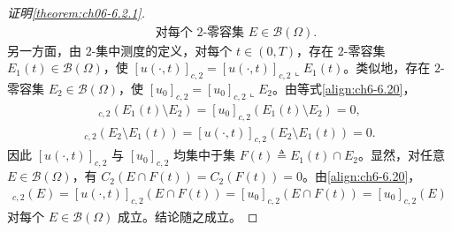\documentclass[../../main.tex]{subfiles}%
\begin{document}
\begin{proof}[证明\cref{theorem:ch06-6.2.1}]
\begin{align}
\quad\text{对每个 }2\text{-零容集 }E\in\mathscr{B}(\Omega). \label{align:ch6-6.20}
\end{align}
另一方面，由 $2$-集中测度的定义，对每个 $t\in(0,T)$，存在 $2$-零容集 $E_1(t)\in\mathscr{B}(\Omega)$，使 $[u(\cdot,t)]_{c,2}=[u(\cdot,t)]_{c,2}\llcorner E_1(t)$。类似地，存在 $2$-零容集 $E_2\in\mathscr{B}(\Omega)$，使 $[u_0]_{c,2}=[u_0]_{c,2}\llcorner E_2$。由等式\eqref{align:ch6-6.20}，
\begin{align*}
[u(\cdot,t)]_{c,2}(E_1(t)\setminus E_2)=[u_0]_{c,2}(E_1(t)\setminus E_2)=0,
\end{align*}
\begin{align*}
[u_0]_{c,2}(E_2\setminus E_1(t))=[u(\cdot,t)]_{c,2}(E_2\setminus E_1(t))=0.
\end{align*}
因此 $[u(\cdot,t)]_{c,2}$ 与 $[u_0]_{c,2}$ 均集中于集 $F(t)\triangleq E_1(t)\cap E_2$。显然，对任意 $E\in\mathscr{B}(\Omega)$，有 $C_2(E\cap F(t))=C_2(F(t))=0$。由\eqref{align:ch6-6.20}，
\begin{align*}
[u(\cdot,t)]_{c,2}(E)=[u(\cdot,t)]_{c,2}(E\cap F(t))
=[u_0]_{c,2}(E\cap F(t))=[u_0]_{c,2}(E)
\end{align*}
对每个 $E\in\mathscr{B}(\Omega)$ 成立。结论随之成立。
\end{proof}
\end{document}
